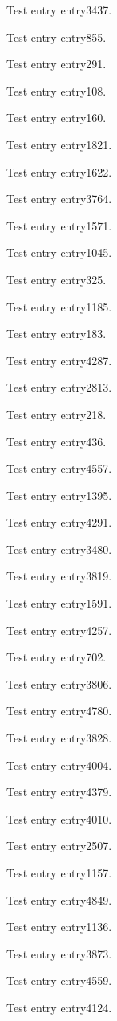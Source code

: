Test entry \gls{entry3437}.

Test entry \gls{entry855}.

Test entry \gls{entry291}.

Test entry \gls{entry108}.

Test entry \gls{entry160}.

Test entry \gls{entry1821}.

Test entry \gls{entry1622}.

Test entry \gls{entry3764}.

Test entry \gls{entry1571}.

Test entry \gls{entry1045}.

Test entry \gls{entry325}.

Test entry \gls{entry1185}.

Test entry \gls{entry183}.

Test entry \gls{entry4287}.

Test entry \gls{entry2813}.

Test entry \gls{entry218}.

Test entry \gls{entry436}.

Test entry \gls{entry4557}.

Test entry \gls{entry1395}.

Test entry \gls{entry4291}.

Test entry \gls{entry3480}.

Test entry \gls{entry3819}.

Test entry \gls{entry1591}.

Test entry \gls{entry4257}.

Test entry \gls{entry702}.

Test entry \gls{entry3806}.

Test entry \gls{entry4780}.

Test entry \gls{entry3828}.

Test entry \gls{entry4004}.

Test entry \gls{entry4379}.

Test entry \gls{entry4010}.

Test entry \gls{entry2507}.

Test entry \gls{entry1157}.

Test entry \gls{entry4849}.

Test entry \gls{entry1136}.

Test entry \gls{entry3873}.

Test entry \gls{entry4559}.

Test entry \gls{entry4124}.

